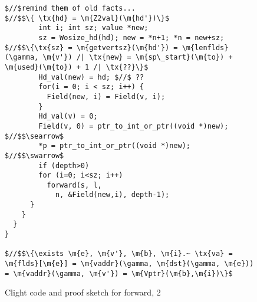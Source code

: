 \begin{figure*}[!ht]
\vspace{-1ex}
  \begin{lstlisting}
$//$remind them of old facts...
$//$$\{ \tx{hd} = \m{Z2val}(\m{hd'})\}$
        int i; int sz; value *new;
        sz = Wosize_hd(hd); new = *n+1; *n = new+sz;
$//$$\{\tx{sz} = \m{getvertsz}(\m{hd'}) = \m{lenflds}(\gamma, \m{v'}) /| \tx{new} = \m{sp\_start}(\m{to}) + \m{used}(\m{to}) + 1 /| \tx{??}\}$        
        Hd_val(new) = hd; $//$ ??
        for(i = 0; i < sz; i++) {
          Field(new, i) = Field(v, i);
        }
        Hd_val(v) = 0;
        Field(v, 0) = ptr_to_int_or_ptr((void *)new);
$//$$\searrow$
        *p = ptr_to_int_or_ptr((void *)new);
$//$$\swarrow$
        if (depth>0)
        for (i=0; i<sz; i++)
          forward(s, l, 
            n, &Field(new,i), depth-1);
      }
    }
  }
}

$//$$\{\exists \m{e}, \m{v'}, \m{b}, \m{i}.~ \tx{va} = \m{flds}[\m{e}] = \m{vaddr}(\gamma, \m{dst}(\gamma, \m{e})) = \m{vaddr}(\gamma, \m{v'}) = \m{Vptr}(\m{b},\m{i})\}$

\end{lstlisting}
\vspace{-0.4em}
\caption{Clight code and proof sketch for forward, 2}
\label{fig:forward2}
\vspace{-1em}
\end{figure*}

